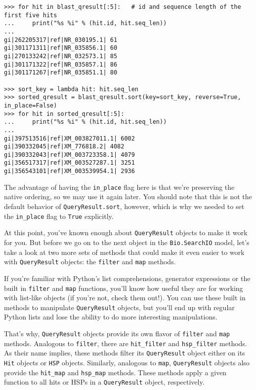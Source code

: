 \begin{verbatim}
>>> for hit in blast_qresult[:5]:   # id and sequence length of the first five hits
...     print("%s %i" % (hit.id, hit.seq_len))
...
gi|262205317|ref|NR_030195.1| 61
gi|301171311|ref|NR_035856.1| 60
gi|270133242|ref|NR_032573.1| 85
gi|301171322|ref|NR_035857.1| 86
gi|301171267|ref|NR_035851.1| 80

>>> sort_key = lambda hit: hit.seq_len
>>> sorted_qresult = blast_qresult.sort(key=sort_key, reverse=True, in_place=False)
>>> for hit in sorted_qresult[:5]:
...     print("%s %i" % (hit.id, hit.seq_len))
...
gi|397513516|ref|XM_003827011.1| 6002
gi|390332045|ref|XM_776818.2| 4082
gi|390332043|ref|XM_003723358.1| 4079
gi|356517317|ref|XM_003527287.1| 3251
gi|356543101|ref|XM_003539954.1| 2936
\end{verbatim}

The advantage of having the \verb|in_place| flag here is that we're preserving
the native ordering, so we may use it again later. You should note that this is
not the default behavior of \verb|QueryResult.sort|, however, which is why we
needed to set the \verb|in_place| flag to \verb|True| explicitly.

At this point, you've known enough about \verb|QueryResult| objects to make it
work for you. But before we go on to the next object in the \verb|Bio.SearchIO|
model, let's take a look at two more sets of methods that could make it even
easier to work with \verb|QueryResult| objects: the \verb|filter| and \verb|map|
methods.

If you're familiar with Python's list comprehensions, generator expressions
or the built in \verb|filter| and \verb|map| functions,
you'll know how useful they are for working with list-like objects (if you're
not, check them out!). You can use these built in methods to manipulate
\verb|QueryResult| objects, but you'll end up with regular Python lists and lose
the ability to do more interesting manipulations.

That's why, \verb|QueryResult| objects provide its own flavor of
\verb|filter| and \verb|map| methods. Analogous to \verb|filter|, there are
\verb|hit_filter| and \verb|hsp_filter| methods. As their name implies, these
methods filter its \verb|QueryResult| object either on its \verb|Hit| objects
or \verb|HSP| objects. Similarly, analogous to \verb|map|, \verb|QueryResult|
objects also provide the \verb|hit_map| and \verb|hsp_map| methods. These
methods apply a given function to all hits or HSPs in a \verb|QueryResult|
object, respectively.

